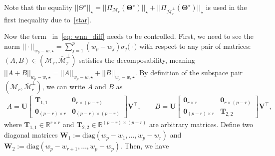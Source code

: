 \documentclass[alpha-refs]{wiley-article}
\newcommand{\RN}[1]{ \textup{\uppercase\expandafter{\romannumeral#1}} }
\begin{document}
Note that the equality $||\Theta^\star||_{\star}=||\Pi_{\mathcal{M}_{r}}(\boldsymbol{\Theta^{\star}})||_{\star} + ||\Pi_{\overline{\mathcal{M}}_{r}^{\perp}}(\boldsymbol{\Theta^{\star}})||_{\star}$ is used in the first inequality due to~\eqref{star}.

Now the term~\RN{2} in~\eqref{eq: wnn_diff} needs to be controlled.
First, we need to see the norm $ ||\cdot||_{w_{p} - w, \star} = \sum^{p}_{j = 1} (w_{p}-w_{j}) \sigma_{j}\big(\cdot\big)$ with respect to any pair of matrices: $(A,B)\in(\mathcal{M}_{r},\overline{\mathcal{M}}_{r}^{\perp})$ satisfies the decomposability, meaning $
||A+B||_{w_{p} - w, \star}=||A||_{w_{p} - w, \star}+||B||_{w_{p} - w, \star}$.
By definition of the subspace pair $(\mathcal{M}_{r},\overline{\mathcal{M}}_{r}^{\perp})$, we can write $A$ and $B$ as 
\begin{align*}
    A = \boldsymbol{U}
    \begin{bmatrix}
        \boldsymbol{T}_{1,1} & \boldsymbol{0}_{r\times (p-r)} \\
        \boldsymbol{0}_{(p-r) \times r} & \boldsymbol{0}_{(p-r) \times (p-r)} 
    \end{bmatrix}
    \boldsymbol{V}^{\top}, \qquad
    B = \boldsymbol{U}
    \begin{bmatrix}
        \boldsymbol{0}_{r \times r} & \boldsymbol{0}_{r\times (p-r)} \\
        \boldsymbol{0}_{(p-r) \times r} & \boldsymbol{T}_{2,2}
    \end{bmatrix}
    \boldsymbol{V}^{\top},
\end{align*}
where $\boldsymbol{T}_{1,1}\in\mathbb{R}^{r \times r}$ and $\boldsymbol{T}_{2,2}\in\mathbb{R}^{(p-r) \times (p-r)}$ are arbitrary matrices.  
Define two diagonal matrices $\boldsymbol{W}_{1}:=\text{diag}(w_{p}-w_{1},\dots,w_{p}-w_{r})$ and $\boldsymbol{W}_{2}:=\text{diag}(w_{p}-w_{r+1},\dots,w_{p}-w_{p})$.
Then, we have 
\end{document}
